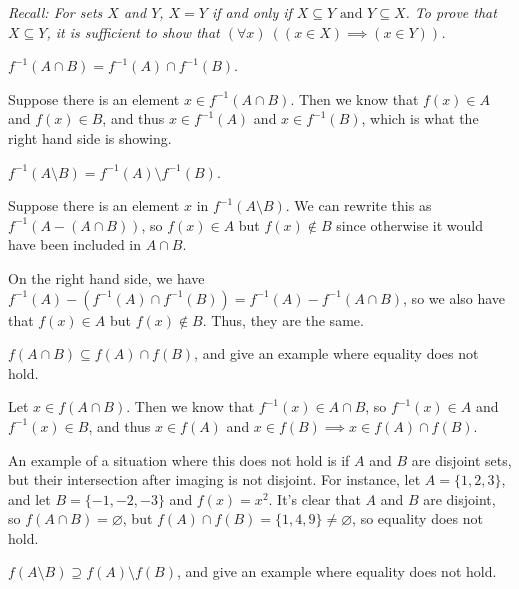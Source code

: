 \documentclass[11pt]{article}
\begin{document}
\textit{Recall: For sets $X$ and $Y$, $X=Y$ if and only if $X \subseteq Y \text{ and } Y \subseteq X$. To prove that $X \subseteq Y$, it is sufficient to show that $(\forall x)~((x \in X) \implies (x \in Y))$.}

\begin{Parts}
    \Part $f^{-1}(A \cap B) = f^{-1}(A) \cap f^{-1}(B)$.

    \begin{solution}
        Suppose there is an element $x \in f^{-1}(A \cap B)$. Then we know that $f(x) \in A$ and $f(x) \in B$, and thus $x \in f^{-1}(A)$ and $x \in f^{-1}(B)$, which is what the right hand side is showing.
    \end{solution}
    \Part $f^{-1}(A \setminus B) = f^{-1}(A) \setminus f^{-1}(B)$.

    \begin{solution}
        Suppose there is an element $x$ in $f^{-1}(A \setminus B)$. We can rewrite this as $f^{-1}(A - (A \cap B))$, so $f(x) \in A$ but $f(x) \notin B$ since otherwise it would have been included in $A \cap B$.

        
        On the right hand side, we have $f^{-1}(A) - (f^{-1}(A) \cap f^{-1}(B)) = f^{-1}(A) - f^{-1}(A \cap B)$, so we also have that $f(x) \in A$ but $f(x) \notin B$. Thus, they are the same. 
    \end{solution}


    \Part $f(A \cap B) \subseteq f(A) \cap f(B)$, and give an example where equality does not hold.

    \begin{solution}
        Let $x \in f(A \cap B)$. Then we know that $f^{-1}(x) \in A \cap B$, so $f^{-1}(x) \in A$ and $f^{-1}(x) \in B$, and thus $x \in f(A)$ and $x \in f(B) \implies x \in f(A)\cap f(B)$. 

        An example of a situation where this does not hold is if $A$ and $B$ are disjoint sets, but their intersection after imaging is not disjoint. For instance, let $A = \{1, 2, 3\}$, and let $B = \{-1, -2, -3\}$ and $f(x) = x^2$. It's clear that $A$ and $B$ are disjoint, so $f(A \cap B) = \varnothing$, but $f(A) \cap f(B) = \{1, 4, 9\} \neq \varnothing$, so equality does not hold.
    \end{solution}
    \Part $f(A \setminus B) \supseteq f(A) \setminus f(B)$, and give an example where equality does not hold.


\end{Parts}
\end{document}
